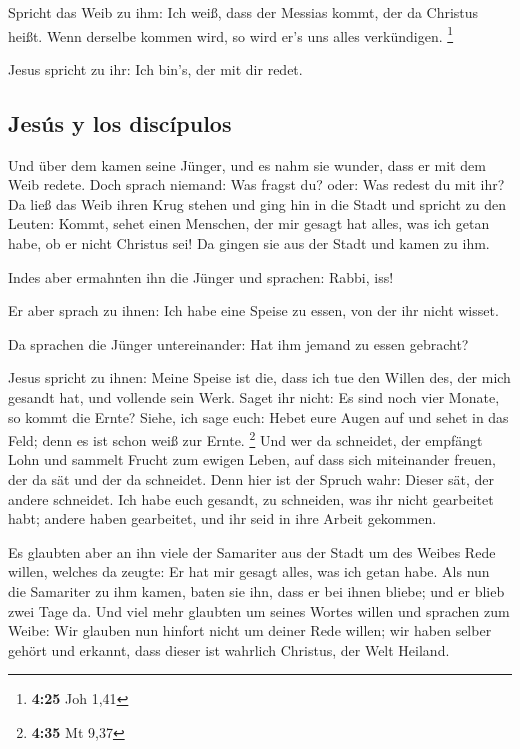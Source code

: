  Spricht das Weib zu ihm: Ich weiß, dass der Messias
kommt, der da Christus heißt. Wenn derselbe kommen wird, so wird er's
uns alles verkündigen. \footnote{\textbf{4:25} Joh 1,41}

 Jesus spricht zu ihr: Ich bin's, der mit dir redet.

\hypertarget{jesuxfas-y-los-discuxedpulos}{%
\subsection{Jesús y los discípulos}\label{jesuxfas-y-los-discuxedpulos}}

 Und über dem kamen seine Jünger, und es nahm sie wunder,
dass er mit dem Weib redete. Doch sprach niemand: Was fragst du? oder:
Was redest du mit ihr?  Da ließ das Weib ihren Krug
stehen und ging hin in die Stadt und spricht zu den Leuten:
 Kommt, sehet einen Menschen, der mir gesagt hat alles,
was ich getan habe, ob er nicht Christus sei!  Da gingen
sie aus der Stadt und kamen zu ihm.

 Indes aber ermahnten ihn die Jünger und sprachen: Rabbi,
iss!

 Er aber sprach zu ihnen: Ich habe eine Speise zu essen,
von der ihr nicht wisset.

 Da sprachen die Jünger untereinander: Hat ihm jemand zu
essen gebracht?

 Jesus spricht zu ihnen: Meine Speise ist die, dass ich
tue den Willen des, der mich gesandt hat, und vollende sein Werk.
 Saget ihr nicht: Es sind noch vier Monate, so kommt die
Ernte? Siehe, ich sage euch: Hebet eure Augen auf und sehet in das Feld;
denn es ist schon weiß zur Ernte. \footnote{\textbf{4:35} Mt 9,37}
 Und wer da schneidet, der empfängt Lohn und sammelt
Frucht zum ewigen Leben, auf dass sich miteinander freuen, der da sät
und der da schneidet.  Denn hier ist der Spruch wahr:
Dieser sät, der andere schneidet.  Ich habe euch gesandt,
zu schneiden, was ihr nicht gearbeitet habt; andere haben gearbeitet,
und ihr seid in ihre Arbeit gekommen.

 Es glaubten aber an ihn viele der Samariter aus der
Stadt um des Weibes Rede willen, welches da zeugte: Er hat mir gesagt
alles, was ich getan habe.  Als nun die Samariter zu ihm
kamen, baten sie ihn, dass er bei ihnen bliebe; und er blieb zwei Tage
da.  Und viel mehr glaubten um seines Wortes willen
 und sprachen zum Weibe: Wir glauben nun hinfort nicht um
deiner Rede willen; wir haben selber gehört und erkannt, dass dieser ist
wahrlich Christus, der Welt Heiland.

